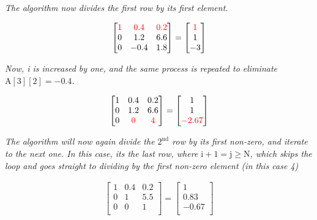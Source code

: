 \textit{The algorithm now divides the first row by its first element.}

\begin{align*}
    \begin{bmatrix}
        \color{red}1 & \color{red}0.4 & \color{red}0.2 \\
        0 & 1.2 & 6.6 \\
        0 & -0.4 & 1.8 \\
    \end{bmatrix}
    =
    \begin{bmatrix}
        \color{red}1 \\
        1 \\
        -3 \\
    \end{bmatrix}
\end{align*}

\textit{Now, i is increased by one, and the same process is repeated to eliminate $\mathrm{A[3][2] = -0.4}$.}

\begin{align*}
    \begin{bmatrix}
        1 & 0.4 & 0.2 \\
        0 & 1.2 & 6.6 \\
        0 & \color{red}0 & \color{red}4 \\
    \end{bmatrix}
    =
    \begin{bmatrix}
        1 \\
        1 \\
        \color{red}-2.67 \\
    \end{bmatrix}
\end{align*}

\textit{The algorithm will now again divide the $\mathrm{2^{nd}}$ row by its first non-zero, and iterate to the next one. In this case, its the last row, where $\mathrm{i+1 = j \geq N}$, which skips the loop and goes straight to dividing by the first non-zero element (in this case 4)}

\begin{align*}
    \begin{bmatrix}
        1 & 0.4 & 0.2 \\
        0 & 1 & 5.5 \\
        0 & 0 & 1 \\
    \end{bmatrix}
    =
    \begin{bmatrix}
        1 \\
        0.83 \\
        -0.67 \\
    \end{bmatrix}
\end{align*}

